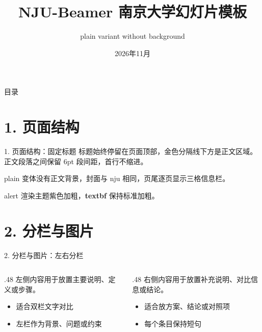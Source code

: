 \documentclass[aspectratio=169,10pt]{beamer}
\title[NJU-Beamer]{NJU-Beamer 南京大学幻灯片模板}
\subtitle{plain variant without background}
\date{2026年11月}
\begin{document}
\NJUtitleframe

\begin{frame}{目录}
  \tableofcontents
\end{frame}

\section{1. 页面结构}

\begin{frame}{1. 页面结构：固定标题}
标题始终停留在页面顶部，金色分隔线下方是正文区域。正文段落之间保留 6pt 段间距，首行不缩进。

plain 变体没有正文背景，封面与 nju 相同，页尾逐页显示三格信息栏。


\alert{alert} 渲染主题紫色加粗，\textbf{textbf} 保持标准加粗。
\end{frame}

\section{2. 分栏与图片}

\begin{frame}{2. 分栏与图片：左右分栏}
\begin{columns}[T,onlytextwidth]
  \begin{column}{.48\textwidth}
    左侧内容用于放置主要说明、定义或步骤。
    \begin{itemize}
      \item 适合双栏文字对比
      \item 左栏作为背景、问题或约束
    \end{itemize}
  \end{column}
  \begin{column}{.48\textwidth}
    右侧内容用于放置补充说明、对比信息或结论。
    \begin{itemize}
      \item 适合放方案、结论或对照项
      \item 每个条目保持短句
    \end{itemize}
  \end{column}
\end{columns}
\end{frame}
\end{document}
